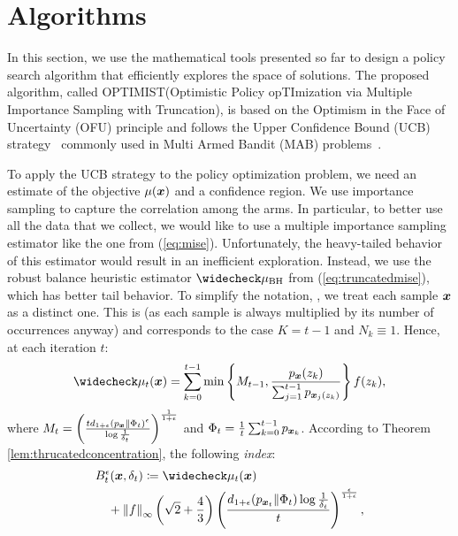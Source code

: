 \documentclass{article}
\makeatletter
\DeclareRobustCommand{\algoname}{OPTIMIST\@\xspace}
\makeatother
\begin{document}
\section{Algorithms}\label{sec:algo}
In this section, we use the mathematical tools presented so far to design a policy search algorithm that efficiently explores the space of solutions. The proposed algorithm, called \algoname (Optimistic Policy opTImization via Multiple Importance Sampling with Truncation), is based on the Optimism in the Face of Uncertainty (OFU) principle and follows the Upper Confidence Bound (UCB) strategy~\citep{lai1985asymptotically,agrawal1995sample,auer2002finite} commonly used in Multi Armed Bandit (MAB) problems~\citep{robbins1985some,bubeck2012regret,lattimore2019bandit}. 

To apply the UCB strategy to the policy optimization problem, we need an estimate of the objective $\mu(\boldsymbol{x})$ and a confidence region. We use importance sampling to capture the correlation among the arms. In particular, to better use all the data that we collect, we would like to use a multiple importance sampling estimator like the one from (\ref{eq:mise}). Unfortunately, the heavy-tailed behavior of this estimator would result in an inefficient exploration.
Instead, we use the robust balance heuristic estimator $\wc{\mu}_{\text{BH}}$ from (\ref{eq:truncatedmise}), which has better tail behavior. To simplify the notation, , we treat each sample $\boldsymbol{x}$ as a distinct one. This is \wlg (as each sample is always multiplied by its number of occurrences anyway) and corresponds to the case $K=t-1$ and $N_k\equiv1$. Hence, at each iteration $t$:
\begin{align}\label{eq:wcmu}
	\wc{\mu}_t(\vx) = \sum_{k=0}^{t-1}
	\min\left\{M_{t-1}, \frac{p_{\vx}(z_k)}
	{\sum_{j=1}^{t-1}p_{\vx_j(z_k)}}\right\}f(z_k),
\end{align}
where ${M_{t} = \left(\frac{td_{1+\epsilon}(p_{\boldsymbol{x}}\|\Phi_t)^{\epsilon}}{\log\frac{1}{\delta_t}}\right)^{\frac{1}{1+\epsilon}}}$ and ${\Phi_t = \frac{1}{t}\sum_{k=0}^{t-1}p_{\boldsymbol{x}_k}}$.
According to Theorem \ref{lem:thrucatedconcentration}, the following \textit{index}:
\begin{align}
	&B_t^{\epsilon}(\vx,\delta_t) \coloneqq 
	\wc{\mu}_t(\vx) \nonumber\\
	&\quad+\norm[\infty]{f}\left(\sqrt{2}+\frac{4}{3}\right)
	\left(\frac{d_{1+\epsilon}(p_{\vx_t}\|\Phi_{t})\log\frac{1}{\delta_t}}{t}\right)^{\frac{\epsilon}{1+\epsilon}},
\end{align}
\end{document}
